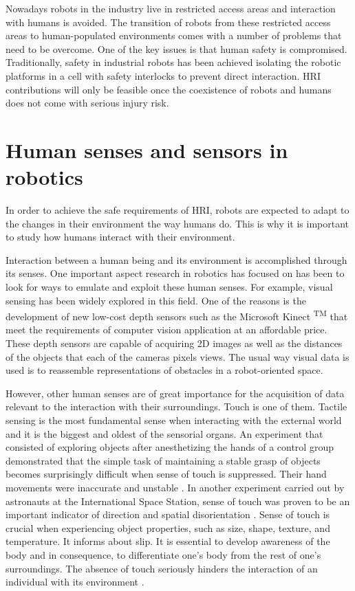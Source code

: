 Nowadays robots in the industry live in restricted access areas and interaction with humans is avoided. The transition of robots from these restricted access areas to human-populated environments comes with a number of problems that need to be overcome. One of the key issues is that human safety is compromised. Traditionally, safety in industrial robots has been achieved isolating the robotic platforms in a cell with safety interlocks to prevent direct interaction. HRI contributions will only be feasible once the coexistence of robots and humans does not come with serious injury risk.

\section{Human senses and sensors in robotics}
In order to achieve the safe requirements of HRI, robots are expected to adapt to the changes in their environment the way humans do. This is why it is important to study how humans interact with their environment.

Interaction between a human being and its environment is accomplished through its senses. One important aspect research in robotics has focused on has been to look for ways to emulate and exploit these human senses. For example, visual sensing has been widely explored in this field. One of the reasons is the development of new low-cost depth sensors such as the Microsoft Kinect \textsuperscript{TM} that meet the requirements of computer vision application at an affordable price. These depth sensors are capable of acquiring 2D images as well as the distances of the objects that each of the cameras pixels views. The usual way visual data is used is to reassemble representations of obstacles in a robot-oriented space.

However, other human senses are of great importance for the acquisition of data relevant to the interaction with their surroundings. Touch is one of them. Tactile sensing is the most fundamental sense when interacting with the external world and it is the biggest and oldest of the sensorial organs. An experiment that consisted of exploring objects after anesthetizing the hands of a control group demonstrated that the simple task of maintaining a stable grasp of objects becomes surprisingly difficult when sense of touch is suppressed. Their hand movements were inaccurate and unstable \cite{westling1984factors}. In another experiment carried out by astronauts at the International Space Station, sense of touch was proven to be an important indicator of direction and spatial disorientation \cite{van2006touch}. Sense of touch is crucial when experiencing object properties, such as size, shape, texture, and temperature. It informs about slip. It is essential to develop awareness of the body and in consequence, to differentiate one’s body from the rest of one’s surroundings. The absence of touch seriously hinders the interaction of an individual with its environment \cite{dahiya2009tactile}.

